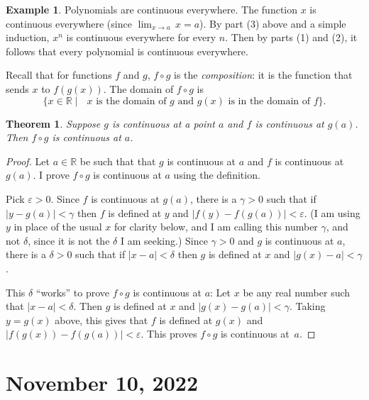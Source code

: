 \documentclass[12pt]{amsart}
\def\d{\delta}
\def\e{\varepsilon}
\newcommand{\R}{{\mathbb{R}}}
\numberwithin{equation}{section}
\theoremstyle{plain} %
\newtheorem{thm}[equation]{Theorem}
\newcommand{\Nov}[1]{\section{November #1, 2022}}
\theoremstyle{definition}
\newtheorem{ex}[equation]{Example}
\theoremstyle{remark}
\begin{document}
\begin{ex} Polynomials are continuous everywhere. The function $x$ is continuous everywhere (since $\lim_{x\to a} \, x = a$). By part (3) above and a simple induction, $x^n$ is continuous everywhere for every $n$. Then by parts (1) and (2), it follows that every polynomial is continuous everywhere.
\end{ex}

Recall that for functions $f$ and $g$, $f \circ g$ is the {\em composition}: it is the function that
sends $x$ to $f(g(x))$. The domain of $f \circ g$ is
$$
\{x \in \R \mid \text{ $x$ is the domain of $g$ and $g(x)$ is in the domain of $f$} \}.
$$


\begin{thm} Suppose $g$ is continuous at a point $a$ and $f$ is continuous at $g(a)$. Then $f \circ
  g$ is continuous at $a$.
\end{thm}
\begin{proof}
  Let $a \in \R$ be such that that $g$ is continuous at $a$ and $f$ is continuous at $g(a)$.
  I prove $f \circ g$ is continuous at $a$ using the definition.
  
 Pick $\e > 0$. Since $f$ is continuous at $g(a)$, there is a $\gamma > 0$ such that if $|y
  - g(a)| < \gamma$ then $f$ is defined at $y$ and $|f(y) - f(g(a))| < \e$. (I am using $y$ in place of the usual $x$ for clarity below, and 
I am calling this number $\gamma$, and not $\d$, since it is
  not the $\d$ I am seeking.) Since $\gamma > 0$ and $g$ is continuous at $a$, there is a $\d > 0$ such
  that if $|x - a| < \d$ then $g$ is defined at $x$ and $|g(x) - a| < \gamma$. 

  This $\d$ ``works'' to prove $f \circ g$ is continuous at $a$: Let $x$ be any real number such that  $|x-a| < \d$. Then $g$ is defined at $x$ and {${|g(x) - g(a)| < \gamma}$}.
  Taking $y = g(x)$ above, this gives that $f$ is defined at $g(x)$ and $|f(g(x)) -
f(g(a))| < \e$. This proves $f \circ g$ is continuous at~$a$.
\end{proof}




\Nov{10}
\end{document}
